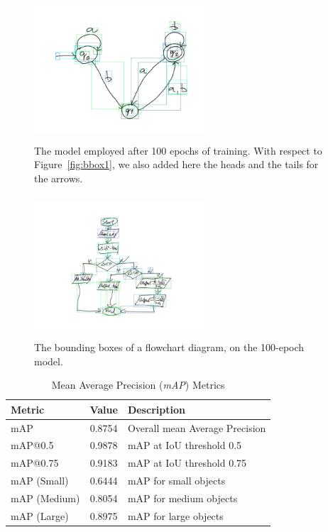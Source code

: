 \documentclass[conference]{IEEEtran}
\begin{document}
\begin{figure}[H]
	\centering
	\includegraphics[width=180pt, height=150pt]{bbox3.png}
	\caption{The model employed after 100 epochs of training. With respect to Figure~\ref{fig:bbox1}, we also added here the heads and the tails for the arrows.}
	\label{fig:bbox3}
\end{figure}

\begin{figure}[H]
	\centering
	\includegraphics[width=180pt, height=150pt]{fc.png}
	\caption{The bounding boxes of a flowchart diagram, on the 100-epoch model.}
	\label{fig:fc}
\end{figure}

\begin{table}[htbp]
	\centering
	\caption{Mean Average Precision (\textit{mAP}) Metrics}
	\begin{tabular}{|l|c|l|}
		\hline
		\textbf{Metric} & \textbf{Value} & \textbf{Description} \\
		\hline
		mAP & 0.8754 & Overall mean Average Precision \\
		mAP@0.5 & 0.9878 & mAP at IoU threshold 0.5 \\
		mAP@0.75 & 0.9183 & mAP at IoU threshold 0.75 \\
		\hline
		mAP (Small) & 0.6444 & mAP for small objects \\
		mAP (Medium) & 0.8054 & mAP for medium objects \\
		mAP (Large) & 0.8975 & mAP for large objects \\
		\hline
	\end{tabular}
	\label{tab:map}
\end{table}
\end{document}
